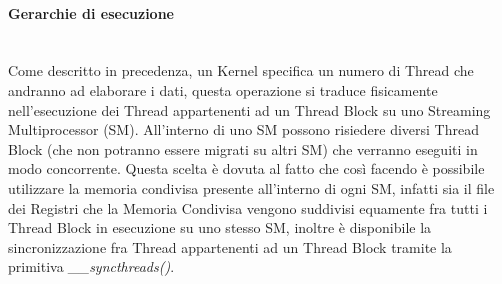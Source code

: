 \paragraph{Gerarchie di esecuzione}\mbox{}
\\
Come descritto in precedenza, un Kernel specifica un numero di Thread che
andranno ad elaborare i dati, questa operazione si traduce fisicamente
nell'esecuzione dei Thread appartenenti ad un Thread Block su uno
Streaming Multiprocessor (SM)\cite{kirk2007nvidia}. All'interno di uno SM possono risiedere
diversi Thread Block (che non potranno essere migrati su altri SM)
che verranno eseguiti in modo concorrente. Questa scelta è dovuta al fatto
che così facendo è possibile utilizzare la memoria condivisa presente
all'interno di ogni SM, infatti sia il file dei Registri che la Memoria
Condivisa vengono suddivisi equamente fra tutti i Thread Block in esecuzione
su uno stesso SM, inoltre è disponibile la sincronizzazione fra Thread
appartenenti ad un Thread Block tramite la primitiva \textit{\_\_syncthreads()}.

